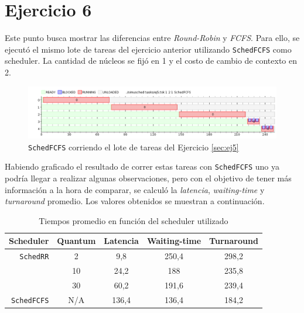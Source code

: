 \section{Ejercicio 6}

Este punto busca mostrar las diferencias entre \emph{Round-Robin} y \emph{FCFS}.
Para ello, se ejecutó el mismo lote de tareas del ejercicio anterior utilizando
\texttt{SchedFCFS} como scheduler. La cantidad de núcleos se fijó en 1 y el
costo de cambio de contexto en 2.

\begin{figure}[H]
	\begin{center}
		\includegraphics[width=1\columnwidth]{imagenes/ej6.png}
		\caption{\texttt{SchedFCFS} corriendo el lote de tareas del Ejercicio \ref{sec:ej5}}
	\end{center}
\end{figure}

Habiendo graficado el resultado de correr estas tareas con \texttt{SchedFCFS}
uno ya podría llegar a realizar algunas observaciones, pero con el objetivo de
tener más información a la hora de comparar, se calculó la
\emph{latencia}, \emph{waiting-time} y \emph{turnaround} promedio. Los valores
obtenidos se muestran a continuación.

\begin{table}[H]
	\begin{center}
		\begin{tabular}{|r|c|c|c|c|}
			\hline
			\textbf{Scheduler} & \textbf{Quantum} & \textbf{Latencia} & \textbf{Waiting-time} & \textbf{Turnaround} \\ \hline
			\texttt{SchedRR} & 2 & 9,8 & 250,4 & 298,2 \\ \cline{2-5}
			& 10 & 24,2 & 188 & 235,8 \\ \cline{2-5}
			& 30 & 60,2 & 191,6 & 239,4 \\ \hline
			\texttt{SchedFCFS} & N/A & 136,4 & 136,4 & 184,2 \\ \hline
		\end{tabular}
		\caption{Tiempos promedio en función del scheduler utilizado}
	\end{center}
\end{table}

